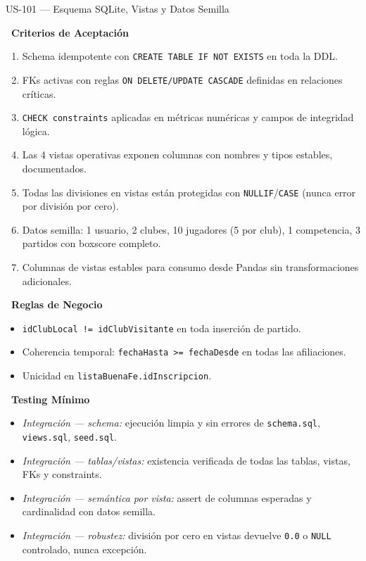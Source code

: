 \documentclass[11pt,a4paper]{article}
\newcommand{\fpath}[1]{\texttt{\small #1}}
\newcommand{\usfield}[2][\;]{%
  \par\vspace{5pt}%
  {\small\textbf{\textcolor{primary}{#2}}}\par\vspace{2pt}%
}
\begin{document}
\begin{uscard}{US-101 — Esquema SQLite, Vistas y Datos Semilla}
\usfield{\faCheckCircle\ Criterios de Aceptación}
\begin{enumerate}[label=\textcolor{accent}{\textbf{AC\arabic*.}}, nosep, leftmargin=2.2em]
  \item Schema idempotente con \fpath{CREATE TABLE IF NOT EXISTS} en toda la DDL.
  \item FKs activas con reglas \fpath{ON DELETE/UPDATE CASCADE} definidas en relaciones críticas.
  \item \fpath{CHECK constraints} aplicadas en métricas numéricas y campos de integridad lógica.
  \item Las 4 vistas operativas exponen columnas con nombres y tipos estables, documentados.
  \item Todas las divisiones en vistas están protegidas con \fpath{NULLIF}/\fpath{CASE} (nunca error por división por cero).
  \item Datos semilla: 1 usuario, 2 clubes, 10 jugadores (5 por club), 1 competencia, 3 partidos con boxscore completo.
  \item Columnas de vistas estables para consumo desde Pandas sin transformaciones adicionales.
\end{enumerate}

\usfield{\faExclamationCircle\ Reglas de Negocio}
\begin{itemize}[nosep, leftmargin=1.6em]
  \item \fpath{idClubLocal != idClubVisitante} en toda inserción de partido.
  \item Coherencia temporal: \fpath{fechaHasta >= fechaDesde} en todas las afiliaciones.
  \item Unicidad en \fpath{listaBuenaFe.idInscripcion}.
\end{itemize}

\usfield{\faFlask\ Testing Mínimo}
\begin{itemize}[nosep, leftmargin=1.6em]
  \item \textit{Integración — schema:} ejecución limpia y sin errores de \fpath{schema.sql}, \fpath{views.sql}, \fpath{seed.sql}.
  \item \textit{Integración — tablas/vistas:} existencia verificada de todas las tablas, vistas, FKs y constraints.
  \item \textit{Integración — semántica por vista:} assert de columnas esperadas y cardinalidad con datos semilla.
  \item \textit{Integración — robustez:} división por cero en vistas devuelve \texttt{0.0} o \texttt{NULL} controlado, nunca excepción.
\end{itemize}

\end{uscard}
\end{document}
